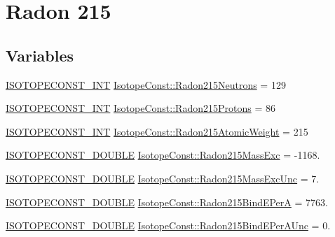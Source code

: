 \hypertarget{group___isotope_const-_radon-_rn215}{}\section{Radon 215}
\label{group___isotope_const-_radon-_rn215}
\subsection*{Variables}
\begin{DoxyCompactItemize}
\item 
\mbox{\hyperlink{group___isotope_const-_macros_ga5f18360b3e99483a35c32d789e62621c}{I\+S\+O\+T\+O\+P\+E\+C\+O\+N\+S\+T\+\_\+\+I\+NT}} \mbox{\hyperlink{group___isotope_const-_radon-_rn215_gaa8ce94260b4d9b8a400e38446d444e55}{Isotope\+Const\+::\+Radon215\+Neutrons}} = 129
\item 
\mbox{\hyperlink{group___isotope_const-_macros_ga5f18360b3e99483a35c32d789e62621c}{I\+S\+O\+T\+O\+P\+E\+C\+O\+N\+S\+T\+\_\+\+I\+NT}} \mbox{\hyperlink{group___isotope_const-_radon-_rn215_ga291b0334e7613b8981a022f36548bb44}{Isotope\+Const\+::\+Radon215\+Protons}} = 86
\item 
\mbox{\hyperlink{group___isotope_const-_macros_ga5f18360b3e99483a35c32d789e62621c}{I\+S\+O\+T\+O\+P\+E\+C\+O\+N\+S\+T\+\_\+\+I\+NT}} \mbox{\hyperlink{group___isotope_const-_radon-_rn215_ga97c0f03697bee242b0303add1c497b19}{Isotope\+Const\+::\+Radon215\+Atomic\+Weight}} = 215
\item 
\mbox{\hyperlink{group___isotope_const-_macros_ga8f45a7272ce02c0b4c65c44636ed719a}{I\+S\+O\+T\+O\+P\+E\+C\+O\+N\+S\+T\+\_\+\+D\+O\+U\+B\+LE}} \mbox{\hyperlink{group___isotope_const-_radon-_rn215_gae24ec0d38185779985fa2596e9b9adc6}{Isotope\+Const\+::\+Radon215\+Mass\+Exc}} = -\/1168.
\item 
\mbox{\hyperlink{group___isotope_const-_macros_ga8f45a7272ce02c0b4c65c44636ed719a}{I\+S\+O\+T\+O\+P\+E\+C\+O\+N\+S\+T\+\_\+\+D\+O\+U\+B\+LE}} \mbox{\hyperlink{group___isotope_const-_radon-_rn215_ga24fe1ab43dd1a507f48ce3b7e4529c34}{Isotope\+Const\+::\+Radon215\+Mass\+Exc\+Unc}} = 7.
\item 
\mbox{\hyperlink{group___isotope_const-_macros_ga8f45a7272ce02c0b4c65c44636ed719a}{I\+S\+O\+T\+O\+P\+E\+C\+O\+N\+S\+T\+\_\+\+D\+O\+U\+B\+LE}} \mbox{\hyperlink{group___isotope_const-_radon-_rn215_ga5ba897dd0a2db12a0e55097b6d4ed0a4}{Isotope\+Const\+::\+Radon215\+Bind\+E\+PerA}} = 7763.
\item 
\mbox{\hyperlink{group___isotope_const-_macros_ga8f45a7272ce02c0b4c65c44636ed719a}{I\+S\+O\+T\+O\+P\+E\+C\+O\+N\+S\+T\+\_\+\+D\+O\+U\+B\+LE}} \mbox{\hyperlink{group___isotope_const-_radon-_rn215_ga9ac7589c46f5c2e20d1c39ce39345bae}{Isotope\+Const\+::\+Radon215\+Bind\+E\+Per\+A\+Unc}} = 0.

\end{DoxyCompactItemize}
